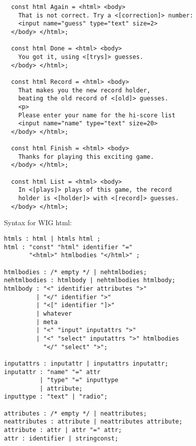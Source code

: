 \begin{slide*}
\begin{scriptsize}
\begin{verbatim}
  const html Again = <html> <body>
    That is not correct. Try a <[correction]> number:
    <input name="guess" type="text" size=2>
  </body> </html>; 
   
  const html Done = <html> <body>
    You got it, using <[trys]> guesses.
  </body> </html>; 
     
  const html Record = <html> <body>
    That makes you the new record holder,
    beating the old record of <[old]> guesses.
    <p>
    Please enter your name for the hi-score list
    <input name="name" type="text" size=20>
  </body> </html>; 
    
  const html Finish = <html> <body>
    Thanks for playing this exciting game.
  </body> </html>; 
   
  const html List = <html> <body>
    In <[plays]> plays of this game, the record
    holder is <[holder]> with <[record]> guesses.
  </body> </html>; 
\end{verbatim}
\end{scriptsize}
\vfil
\end{slide*}
 
\begin{slide*}
Syntax for WIG html:

\begin{scriptsize}
\begin{verbatim}
htmls : html | htmls html ;
html : "const" "html" identifier "=" 
       "<html>" htmlbodies "</html>" ;

htmlbodies : /* empty */ | nehtmlbodies;
nehtmlbodies : htmlbody | nehtmlbodies htmlbody;
htmlbody : "<" identifier attributes ">"
         | "</" identifier ">"
         | "<[" identifier "]>"
         | whatever
         | meta
         | "<" "input" inputattrs ">"
         | "<" "select" inputattrs ">" htmlbodies 
           "</" "select" ">";

inputattrs : inputattr | inputattrs inputattr;
inputattr : "name" "=" attr
          | "type" "=" inputtype
          | attribute;
inputtype : "text" | "radio";

attributes : /* empty */ | neattributes;
neattributes : attribute | neattributes attribute;
attribute : attr | attr "=" attr;
attr : identifier | stringconst;
\end{verbatim}
\end{scriptsize}
\vfil
\end{slide*}
 
